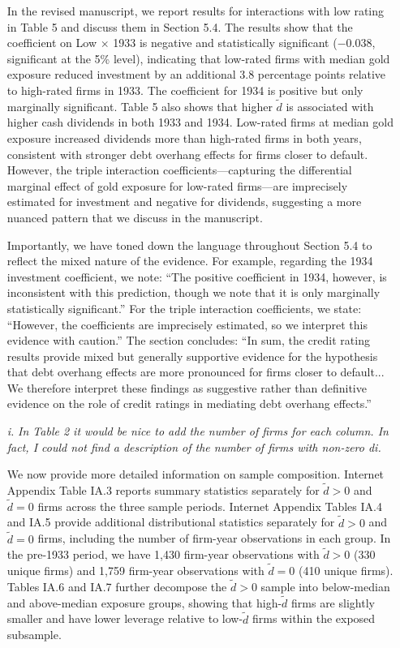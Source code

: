 \begin{itemize}
    In the revised manuscript, we report results for interactions with low rating in Table 5 and discuss them in Section 5.4. The results show that the coefficient on Low $\times$ 1933 is negative and statistically significant ($-0.038$, significant at the 5\% level), indicating that low-rated firms with median gold exposure reduced investment by an additional 3.8 percentage points relative to high-rated firms in 1933. The coefficient for 1934 is positive but only marginally significant. Table 5 also shows that higher $\tilde{d}$ is associated with higher cash dividends in both 1933 and 1934. Low-rated firms at median gold exposure increased dividends more than high-rated firms in both years, consistent with stronger debt overhang effects for firms closer to default. However, the triple interaction coefficients---capturing the differential marginal effect of gold exposure for low-rated firms---are imprecisely estimated for investment and negative for dividends, suggesting a more nuanced pattern that we discuss in the manuscript.
    
    Importantly, we have toned down the language throughout Section 5.4 to reflect the mixed nature of the evidence. For example, regarding the 1934 investment coefficient, we note: ``The positive coefficient in 1934, however, is inconsistent with this prediction, though we note that it is only marginally statistically significant.'' For the triple interaction coefficients, we state: ``However, the coefficients are imprecisely estimated, so we interpret this evidence with caution.'' The section concludes: ``In sum, the credit rating results provide mixed but generally supportive evidence for the hypothesis that debt overhang effects are more pronounced for firms closer to default... We therefore interpret these findings as suggestive rather than definitive evidence on the role of credit ratings in mediating debt overhang effects.''  

    \item[\textit{\textcolor{red!60!black}{i.}}] \textit{\textcolor{red!60!black}{
    In Table 2 it would be nice to add the number of firms for each column. In fact, I could not find a description of the number of firms with non-zero di.
    }}

    \bigskip

    \noindent We now provide more detailed information on sample composition. Internet Appendix Table IA.3 reports summary statistics separately for $\tilde{d} > 0$ and $\tilde{d} = 0$ firms across the three sample periods. Internet Appendix Tables IA.4 and IA.5 provide additional distributional statistics separately for $\tilde{d} > 0$ and $\tilde{d} = 0$ firms, including the number of firm-year observations in each group. In the pre-1933 period, we have 1,430 firm-year observations with $\tilde{d} > 0$ (330 unique firms) and 1,759 firm-year observations with $\tilde{d} = 0$ (410 unique firms). Tables IA.6 and IA.7 further decompose the $\tilde{d} > 0$ sample into below-median and above-median exposure groups, showing that high-$\tilde{d}$ firms are slightly smaller and have lower leverage relative to low-$\tilde{d}$ firms within the exposed subsample.
    

\end{itemize}
